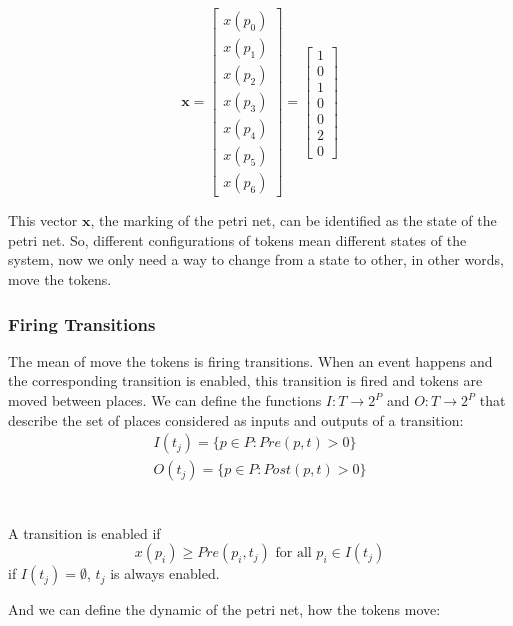 \begin{equation*}
\mathbf{x}=\begin{bmatrix}
  x(p_0)\\
  x(p_1)\\
  x(p_2)\\
  x(p_3)\\
  x(p_4)\\
  x(p_5)\\
  x(p_6)
\end{bmatrix} =
\begin{bmatrix}
  1\\
  0\\
  1\\
  0\\
  0\\
  2\\
  0
\end{bmatrix}
\end{equation*}

This vector $\mathbf{x}$, the marking of the petri net, can be identified as the
state of the petri net. So, different configurations of tokens mean different
states of the system, now we only need a way to change from a state to other, in
other words, move the tokens.

\subsubsection{Firing Transitions}
\label{sec:firingTransitions}
The mean of move the tokens is firing transitions. When an event  happens and
the corresponding transition is enabled, this transition is fired and tokens
are moved between places.
We can define the functions $I : T \rightarrow 2^P$ and $O : T \rightarrow 2^P$ that
describe the set of places considered as inputs and outputs of a transition: 
\begin{align*}
  I(t_j)= \{p \in P : Pre(p,t)> 0\}\\
  O(t_j)= \{p \in P : Post(p,t)> 0\}\\
\end{align*}
\begin{definition}
  \label{def:enabledTransition}~\\
  A transition is enabled if
  \[ x(p_i)\geq Pre(p_i,t_j) \text{ for all }{p_i \in I(t_j)}\]
  if $I(t_j)=\emptyset$, $t_j$ is always enabled. 
\end{definition}

And we can define the dynamic of the petri net, how the tokens move: 

